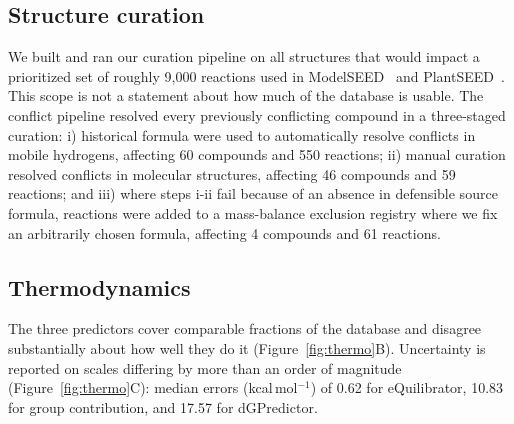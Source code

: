 \documentclass[unnumsec,webpdf,modern,large]{oup-authoring-template}
\begin{document}
\subsection{Structure curation}\label{sec:results-structure}

We built and ran our curation pipeline on all structures that would impact a prioritized set of roughly 9,000 reactions used in ModelSEED~\cite{henry2010,faria2023} and PlantSEED~\cite{seaver2014,seaver2018}.
This scope is not a statement about how much of the database is usable.
The conflict pipeline resolved every previously conflicting compound in a three-staged curation: i) historical formula were used to automatically resolve conflicts in mobile hydrogens, affecting 60 compounds and 550 reactions; ii) manual curation resolved conflicts in molecular structures, affecting 46 compounds and 59 reactions; and iii) where steps i-ii fail because of an absence in defensible source formula, reactions were added to a mass-balance exclusion registry where we fix an arbitrarily chosen formula, affecting 4 compounds and 61 reactions.
\subsection{Thermodynamics}\label{sec:results-thermo}

The three predictors cover comparable fractions of the database and disagree substantially about how well they do it (Figure~\ref{fig:thermo}B). Uncertainty is reported on scales differing by more than an order of magnitude (Figure~\ref{fig:thermo}C): median errors (kcal\,mol$^{-1}$) of 0.62 for eQuilibrator, 10.83 for group contribution, and 17.57 for dGPredictor.
\end{document}
